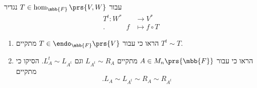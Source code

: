 \documentclass[a4paper,10pt,twoside,openany]{article}
\begin{document}
\begin{exercise}%
עבור
$T \in \hom_{\mbb{F}}\prs{V,W}$
נגדיר
\begin{align*}
T^t \colon W^* &\to V^* \\
\text{.} \hspace{3em} f &\mapsto f \circ T
\end{align*}

\begin{enumerate}
\item הראו כי עבור
$T \in \endo_{\mbb{F}}\prs{V}$
מתקיים
$T^t \sim T$.
\item 
הראו כי
עבור
$A \in M_{n}\prs{\mbb{F}}$
מתקיים
$L_{A^t} \sim R_A$
וגם
$L_A^t \sim L_{A^t}$.
הסיקו כי מתקיים
\[\text{.} L_A \sim L_{A^t} \sim R_A \sim R_{A^t}\]
\end{enumerate}
\end{exercise}
\end{document}
